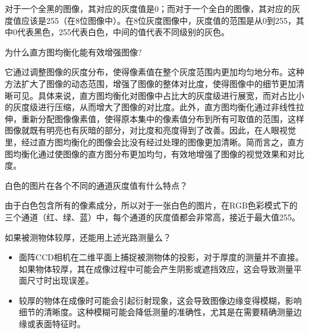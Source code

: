 \documentclass[dvipsnames, svgnames,a4paper,11pt]{article}
\begin{document}
	对于一个全黑的图像，其对应的灰度值是0；而对于一个全白的图像，其对应的灰度值应该是255（在8位图像中）。在8位灰度图像中，灰度值的范围是从0到255，其中0代表黑色，255代表白色，中间的值代表不同级别的灰色。














\begin{question}
	为什么直方图均衡化能有效增强图像?
\end{question}

	它通过调整图像的灰度分布，使得像素值在整个灰度范围内更加均匀地分布。这种方法扩大了图像的动态范围，增强了图像的整体对比度，使得图像中的细节更加清晰可见。具体来说，直方图均衡化对图像中占比大的灰度级进行展宽，而对占比小的灰度级进行压缩，从而增大了图像的对比度。此外，直方图均衡化通过非线性拉伸，重新分配图像像素值，使得原本集中的像素值分布到所有可取值的范围，这样图像就既有明亮也有灰暗的部分，对比度和亮度得到了改善。因此，在人眼视觉里，经过直方图均衡化的图像会比没有经过处理的图像更加清晰。简而言之，直方图均衡化通过使图像的直方图分布更加均匀，有效地增强了图像的视觉效果和对比度。













\begin{question}
	白色的图片在各个不同的通道灰度值有什么特点？
\end{question}

	由于白色包含所有的像素成分，所以对于一张白色的图片，在RGB色彩模式下的三个通道（红、绿、蓝）中，每个通道的灰度值都会非常高，接近于最大值255。
















\begin{question}
	如果被测物体较厚，还能用上述光路测量么？
\end{question}

	\begin{itemize}
		\item 面阵CCD相机在二维平面上捕捉被测物体的投影，对于厚度的测量并不直接。如果物体较厚，其在成像过程中可能会产生阴影或遮挡效应，这会导致测量平面尺寸时出现误差。

		\item 较厚的物体在成像时可能会引起衍射现象，这会导致图像边缘变得模糊，影响细节的清晰度。这种模糊可能会降低测量的准确性，尤其是在需要精确测量边缘或表面特征时。
	\end{itemize}
\end{document}
